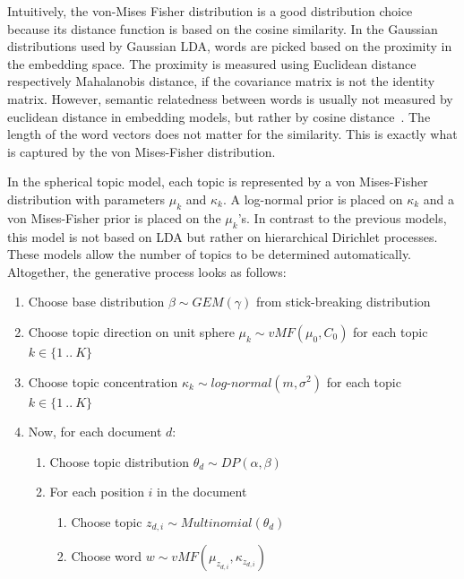 \documentclass[
        a4paper,
        titlepage,
        twoside,
        parskip,
        numbers=noenddot
        ]{scrbook}
\theoremstyle{break}
\begin{document}
Intuitively, the von-Mises Fisher distribution is a good distribution choice because its distance function is based on the cosine similarity.
In the Gaussian distributions used by Gaussian LDA, words are picked based on the proximity in the embedding space.
The proximity is measured using Euclidean distance respectively Mahalanobis distance, if the covariance matrix is not the identity matrix.
However, semantic relatedness between words is usually not measured by euclidean distance in embedding models, but rather by cosine distance~\cite{Mikolov2013a}.
The length of the word vectors does not matter for the similarity.
This is exactly what is captured by the von Mises-Fisher distribution.


In the spherical topic model, each topic is represented by a von Mises-Fisher distribution with parameters $\mu_k$ and $\kappa_k$.
A log-normal prior is placed on $\kappa_k$ and a von Mises-Fisher prior is placed on the $\mu_k$'s.
In contrast to the previous models, this model is not based on LDA but rather on hierarchical Dirichlet processes.
These models allow the number of topics to be determined automatically.
Altogether, the generative process looks as follows:
\begin{enumerate}
    \item Choose base distribution $\beta \sim GEM(\gamma)$ from stick-breaking distribution
    \item Choose topic direction on unit sphere $\mu_k \sim vMF(\mu_0, C_0)$ for each topic $k \in \{1~..~K\}$
    \item Choose topic concentration $\kappa_k \sim log\mbox{-}normal(m, \sigma^2)$ for each topic $k \in \{1~..~K\}$
    \item Now, for each document $d$:
    \begin{enumerate}
        \item Choose topic distribution $\theta_d \sim DP(\alpha, \beta)$
        \item For each position $i$ in the document
        \begin{enumerate}
            \item Choose topic $z_{d,i} \sim Multinomial(\theta_d)$
            \item Choose word $w \sim vMF(\mu_{z_{d,i}}, \kappa_{z_{d,i}})$
        \end{enumerate}
    \end{enumerate}
\end{enumerate}
\end{document}
